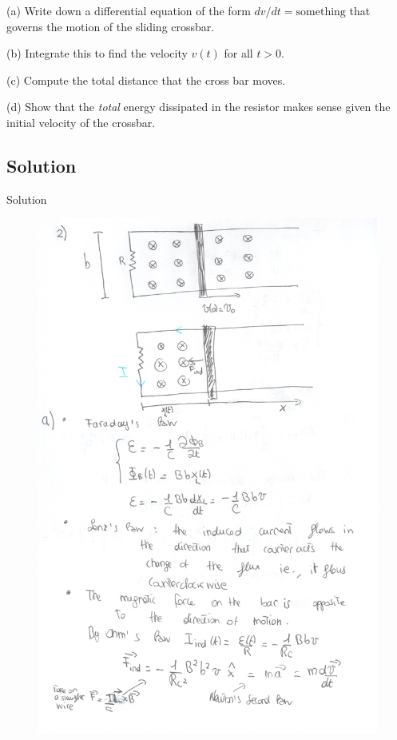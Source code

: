 \documentclass[solutions]{esg8022pset}
\begin{document}
\par\noindent (a) Write down a differential equation of the form
$dv/dt = \mbox{something}$ that governs the motion of the sliding
crossbar.

\par\noindent (b) Integrate this to find the velocity $v(t)$ for all
$t > 0$.

\par\noindent (c) Compute the total distance that the cross bar moves.

\par\noindent (d) Show that the {\it total} energy dissipated in the
resistor makes sense given the initial velocity of the crossbar.
\subsection{Solution}
Solution
  \begin{figure}[H]
    \centering
    \includegraphics[width = 25cm]{ps9_2a}
  \end{figure}
\end{document}
